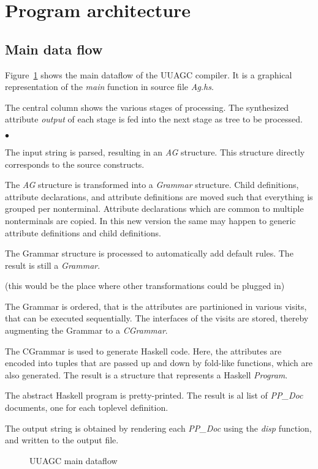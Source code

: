 \documentclass[twoside]{article}
\newenvironment{itize}{\begin{list}{$\bullet$}{\parsep=0pt\parskip=0pt\topsep=0pt\itemsep=0pt}}{\end{list}}
\newcommand{\simplepicture}[2]{\centerline{\mbox{\texttt{[image: figs/\#2]}}}}
\begin{document}
\newpage
\section{Program architecture}

\subsection{Main data flow}

Figure~\ref{fig.dataflow} shows the main dataflow of the UUAGC compiler.
It is a graphical representation of the {\em main} function in source file {\em Ag.hs}.

The central column shows the various stages of processing.
The synthesized attribute {\em output} of each stage is fed
into the next stage as tree to be processed.
\begin{itize}
\item The input string is parsed, resulting in an {\em AG} structure.
      This structure directly corresponds to the source constructs.
\item The {\em AG} structure is transformed into a {\em Grammar} structure.
      Child definitions, attribute declarations, and attribute definitions
      are moved such that everything is grouped per nonterminal.
      Attribute declarations which are common to multiple nonterminals are copied.
      In this new version the same may happen to generic attribute definitions and child definitions.
\item The Grammar structure is processed to automatically add default rules.
      The result is still a {\em Grammar}.
\item (this would be the place where other transformations could be plugged in)
\item The Grammar is ordered, that is the attributes are partinioned in various visits,
      that can be executed sequentially. The interfaces of the visits are stored,
      thereby augmenting the Grammar to a {\em CGrammar}.
\item The CGrammar is used to generate Haskell code.
      Here, the attributes are encoded into tuples that are passed up and down 
      by fold-like functions, which are also generated.
      The result is a structure that represents a Haskell {\em Program}.
\item The abstract Haskell program is pretty-printed.
      The result is al list of {\em PP\_Doc} documents, one for each toplevel definition.
\item The output string is obtained by rendering each {\em PP\_Doc} using the {\em disp} function,
      and written to the output file.
\end{itize}
\begin{figure}[htb]
\raisebox{0mm}{\simplepicture{0.7}{uuagc-dataflow}}
\caption{UUAGC main dataflow}
\label{fig.dataflow}
\end{figure}
\end{document}
